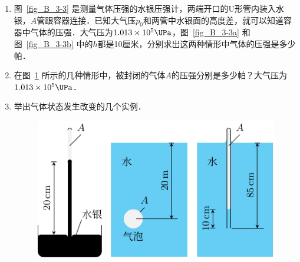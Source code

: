 \begin{enumerate}
    \item 图~\ref{fig_B_3-3} 是测量气体压强的水银压强计，两端开口的U形管内装入水银，$A$管跟容器连接．已知大气压$p_0$和两管中水银面的高度差，就可以知道容器中气体的压强．大气压为$1.013\times 10^5 \UPa$，图~\ref{fig_B_3-3a} 和图~\ref{fig_B_3-3b} 中的$h$都是10厘米，分别求出这两种情形中气体的压强是多少帕．
    \item 在图~\ref{fig_B_3-4} 所示的几种情形中，被封闭的气体$A$的压强分别是多少帕？大气压为$1.013\times 10^5 \UPa $．
    \item 举出气体状态发生改变的几个实例．
\begin{figure}[htbp]
    \centering
    \includegraphics{fig/B/3-4.pdf}
    \caption{}\label{fig_B_3-4}
\end{figure}

\end{enumerate}


